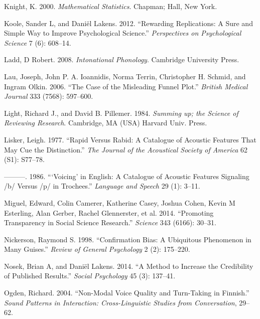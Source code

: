 \documentclass[
  12pt,
]{article}
\newlength{\cslhangindent}
\newenvironment{CSLReferences}[2] %
 {%
  \setlength{\parindent}{0pt}
  \ifodd #1 \everypar{\setlength{\hangindent}{\cslhangindent}}\ignorespaces\fi
  \ifnum #2 > 0
  \setlength{\parskip}{#2\baselineskip}
  \fi
 }%
 {}
\begin{document}
\begin{CSLReferences}{1}{0}
\leavevmode{}%
Knight, K. 2000. \emph{Mathematical Statistics}. Chapman; Hall, New York.

\leavevmode{}%
Koole, Sander L, and Daniël Lakens. 2012. {``Rewarding Replications: A Sure and Simple Way to Improve Psychological Science.''} \emph{Perspectives on Psychological Science} 7 (6): 608--14.

\leavevmode{}%
Ladd, D Robert. 2008. \emph{Intonational Phonology}. Cambridge University Press.

\leavevmode{}%
Lau, Joseph, John P. A. Ioannidis, Norma Terrin, Christopher H. Schmid, and Ingram Olkin. 2006. {``The Case of the Misleading Funnel Plot.''} \emph{British Medical Journal} 333 (7568): 597--600.

\leavevmode{}%
Light, Richard J., and David B. Pillemer. 1984. \emph{Summing up; the Science of Reviewing Research}. Cambridge, MA (USA) Harvard Univ. Press.

\leavevmode{}%
Lisker, Leigh. 1977. {``Rapid Versus Rabid: A Catalogue of Acoustic Features That May Cue the Distinction.''} \emph{The Journal of the Acoustical Society of America} 62 (S1): S77--78.

\leavevmode{}%
---------. 1986. {``{`Voicing'} in {E}nglish: A Catalogue of Acoustic Features Signaling /b/ Versus /p/ in Trochees.''} \emph{Language and Speech} 29 (1): 3--11.

\leavevmode{}%
Miguel, Edward, Colin Camerer, Katherine Casey, Joshua Cohen, Kevin M Esterling, Alan Gerber, Rachel Glennerster, et al. 2014. {``Promoting Transparency in Social Science Research.''} \emph{Science} 343 (6166): 30--31.

\leavevmode{}%
Nickerson, Raymond S. 1998. {``Confirmation Bias: A Ubiquitous Phenomenon in Many Guises.''} \emph{Review of General Psychology} 2 (2): 175--220.

\leavevmode{}%
Nosek, Brian A, and Daniël Lakens. 2014. {``A Method to Increase the Credibility of Published Results.''} \emph{Social Psychology} 45 (3): 137--41.

\leavevmode{}%
Ogden, Richard. 2004. {``Non-Modal Voice Quality and Turn-Taking in {F}innish.''} \emph{Sound Patterns in Interaction: Cross-Linguistic Studies from Conversation}, 29--62.


\end{CSLReferences}
\end{document}
